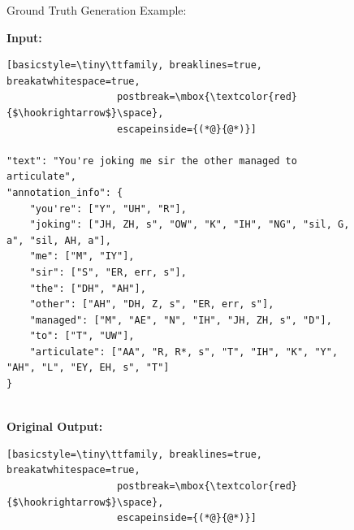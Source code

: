 \documentclass[11pt]{article}
\begin{document}
\begin{figure}[ht]
\begin{AIBox}{Ground Truth Generation Example:}

\begin{minipage}[t]{\textwidth}
{\bf Input:} \scriptsize
\begin{lstlisting}[basicstyle=\tiny\ttfamily, breaklines=true, breakatwhitespace=true,
                   postbreak=\mbox{\textcolor{red}{$\hookrightarrow$}\space},
                   escapeinside={(*@}{@*)}]

"text": "You're joking me sir the other managed to articulate",
"annotation_info": {
    "you're": ["Y", "UH", "R"],
    "joking": ["JH, ZH, s", "OW", "K", "IH", "NG", "sil, G, a", "sil, AH, a"],
    "me": ["M", "IY"],
    "sir": ["S", "ER, err, s"],
    "the": ["DH", "AH"],
    "other": ["AH", "DH, Z, s", "ER, err, s"],
    "managed": ["M", "AE", "N", "IH", "JH, ZH, s", "D"],
    "to": ["T", "UW"],
    "articulate": ["AA", "R, R*, s", "T", "IH", "K", "Y", "AH", "L", "EY, EH, s", "T"]
}


\end{lstlisting}
\end{minipage}

\tcbline

\begin{minipage}[t]{\textwidth}
{\bf Original Output:} \scriptsize
\begin{lstlisting}[basicstyle=\tiny\ttfamily, breaklines=true, breakatwhitespace=true,
                   postbreak=\mbox{\textcolor{red}{$\hookrightarrow$}\space},
                   escapeinside={(*@}{@*)}]


\end{lstlisting}
\end{minipage}
\end{AIBox}
\end{figure}
\end{document}
